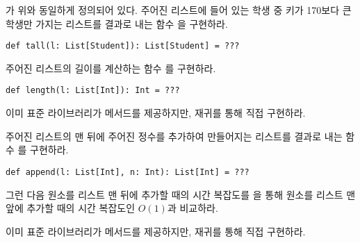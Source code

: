 \begin{exercise}

가 위와 동일하게 정의되어 있다. 주어진 리스트에 들어 있는 학생 중 키가
170보다 큰 학생만 가지는 리스트를 결과로 내는 함수 을 구현하라.

\begin{verbatim}
def tall(l: List[Student]): List[Student] = ???
\end{verbatim}

\end{exercise}

\begin{exercise}

주어진 리스트의 길이를 계산하는 함수 를 구현하라.

\begin{verbatim}
def length(l: List[Int]): Int = ???
\end{verbatim}

이미 표준 라이브러리가  메서드를 제공하지만, 재귀를 통해 직접 구현하라.

\end{exercise}

\begin{exercise}

주어진 리스트의 맨 뒤에 주어진 정수를 추가하여 만들어지는 리스트를 결과로 내는
함수 를 구현하라.

\begin{verbatim}
def append(l: List[Int], n: Int): List[Int] = ???
\end{verbatim}

그런 다음 원소를 리스트 맨 뒤에 추가할 때의 시간 복잡도를 \code{::}을 통해 원소를
리스트 맨 앞에 추가할 때의 시간 복잡도인 $O(1)$과 비교하라.

이미 표준 라이브러리가  메서드를 제공하지만, 재귀를 통해 직접 구현하라.

\end{exercise}
